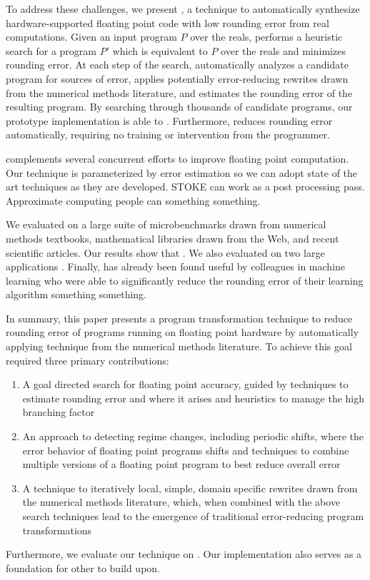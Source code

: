 \documentclass[paper.tex]{subfiles}
\begin{document}
To address these challenges, we present \casio, a technique to
automatically synthesize hardware-supported floating point code with
low rounding error  from real computations.  Given an
input program $P$ over the reals, \casio performs a heuristic search
for a program $P'$ which is equivalent to $P$ over the reals and
minimizes rounding error.  At each step of the search, \casio
automatically analyzes a candidate program for sources of error,
applies potentially error-reducing rewrites drawn from the numerical
methods literature, and estimates the rounding error of the resulting
program.  By searching through thousands of candidate programs, our
prototype implementation is able to .  Furthermore, \casio reduces rounding error
automatically, requiring no training or intervention from the
programmer.

\casio complements several concurrent efforts to improve floating
point computation.  Our technique is parameterized by error estimation
so we can adopt state of the art techniques as they are developed.
STOKE can work as a post processing pass.  Approximate computing
people can something something.

We evaluated \casio on a large suite of microbenchmarks drawn from
numerical methods textbooks, mathematical libraries drawn from the
Web, and recent scientific articles.  Our results show that \casio
{}.  We also evaluated \casio on two large applications
.  Finally, \casio has already been found useful by
colleagues in machine learning who were able to significantly reduce
the rounding error of their learning algorithm something something.

In summary, this paper presents a program transformation technique to
reduce rounding error of programs running on floating point hardware
by automatically applying technique from the numerical methods
literature.  To achieve this goal required three primary
contributions:
\begin{enumerate}
\item A goal directed search for floating point accuracy, guided by
  techniques to estimate rounding error and where it arises and
  heuristics to manage the high branching factor
\item An approach to detecting regime changes, including periodic
  shifts, where the error behavior of floating point programs shifts
  and techniques to combine multiple versions of a floating point
  program to best reduce overall error
\item A technique to iteratively local, simple, domain specific
  rewrites drawn from the numerical methods literature, which, when
  combined with the above search techniques lead to the emergence of
  traditional error-reducing program transformations
\end{enumerate}
Furthermore, we evaluate our technique on .  Our implementation also serves as a foundation for
other to build upon.
\end{document}
